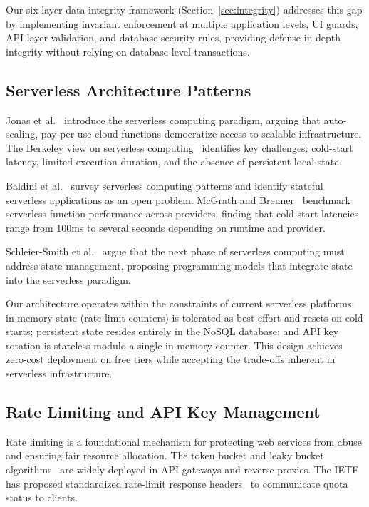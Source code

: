\documentclass[11pt,a4paper]{article}
\theoremstyle{plain}
\theoremstyle{definition}
\theoremstyle{remark}
\begin{document}
Our six-layer data integrity framework (Section~\ref{sec:integrity}) addresses this gap by implementing invariant enforcement at multiple application levels, UI guards, API-layer validation, and database security rules, providing defense-in-depth integrity without relying on database-level transactions.

\subsection{Serverless Architecture Patterns}

Jonas et al.~\cite{jonas2017} introduce the serverless computing paradigm, arguing that auto-scaling, pay-per-use cloud functions democratize access to scalable infrastructure. The Berkeley view on serverless computing~\cite{jonas2019} identifies key challenges: cold-start latency, limited execution duration, and the absence of persistent local state.

Baldini et al.~\cite{baldini2017} survey serverless computing patterns and identify stateful serverless applications as an open problem. McGrath and Brenner~\cite{mcgrath2017} benchmark serverless function performance across providers, finding that cold-start latencies range from 100ms to several seconds depending on runtime and provider.

Schleier-Smith et al.~\cite{schleier-smith2021} argue that the next phase of serverless computing must address state management, proposing programming models that integrate state into the serverless paradigm.

Our architecture operates within the constraints of current serverless platforms: in-memory state (rate-limit counters) is tolerated as best-effort and resets on cold starts; persistent state resides entirely in the NoSQL database; and API key rotation is stateless modulo a single in-memory counter. This design achieves zero-cost deployment on free tiers while accepting the trade-offs inherent in serverless infrastructure.

\subsection{Rate Limiting and API Key Management}

Rate limiting is a foundational mechanism for protecting web services from abuse and ensuring fair resource allocation. The token bucket and leaky bucket algorithms~\cite{tanenbaum2011} are widely deployed in API gateways and reverse proxies. The IETF has proposed standardized rate-limit response headers~\cite{ietf-ratelimit2024} to communicate quota status to clients.
\end{document}
